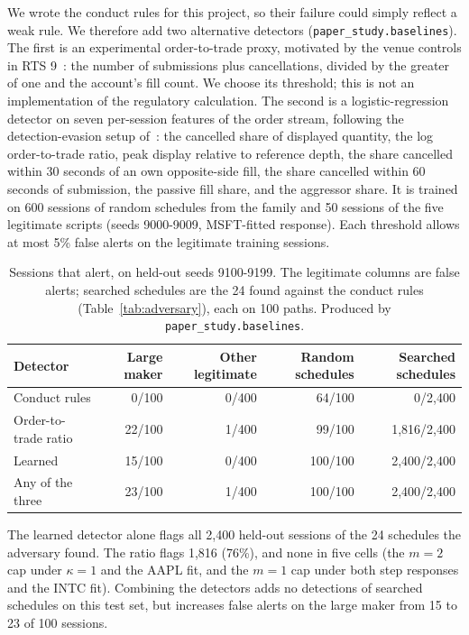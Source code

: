 \documentclass{article}
\begin{document}
We wrote the conduct rules for this project, so their failure could simply reflect a weak rule. We therefore add two alternative detectors (\texttt{paper\_study.baselines}). The first is an experimental order-to-trade proxy, motivated by the venue controls in RTS 9~\cite{r33}: the number of submissions plus cancellations, divided by the greater of one and the account's fill count. We choose its threshold; this is not an implementation of the regulatory calculation. The second is a logistic-regression detector on seven per-session features of the order stream, following the detection-evasion setup of~\cite{r3}: the cancelled share of displayed quantity, the log order-to-trade ratio, peak display relative to reference depth, the share cancelled within 30 seconds of an own opposite-side fill, the share cancelled within 60 seconds of submission, the passive fill share, and the aggressor share. It is trained on 600 sessions of random schedules from the family and 50 sessions of the five legitimate scripts (seeds 9000-9009, MSFT-fitted response). Each threshold allows at most 5\% false alerts on the legitimate training sessions.

\begin{table}[htbp]
\centering
\small
\begin{tabular}{lrrrr}
\toprule
\textbf{Detector} & \textbf{Large maker} & \textbf{Other legitimate} & \textbf{Random schedules} & \textbf{Searched schedules} \\
\midrule
Conduct rules & 0/100 & 0/400 & 64/100 & 0/2,400 \\
Order-to-trade ratio & 22/100 & 1/400 & 99/100 & 1,816/2,400 \\
Learned & 15/100 & 0/400 & 100/100 & 2,400/2,400 \\
Any of the three & 23/100 & 1/400 & 100/100 & 2,400/2,400 \\
\bottomrule
\end{tabular}
\caption{Sessions that alert, on held-out seeds 9100-9199. The legitimate columns are false alerts; searched schedules are the 24 found against the conduct rules (Table~\ref{tab:adversary}), each on 100 paths. Produced by \texttt{paper\_study.baselines}.}
\label{tab:baselines}
\end{table}

The learned detector alone flags all 2,400 held-out sessions of the 24 schedules the adversary found. The ratio flags 1,816 (76\%), and none in five cells (the $m = 2$ cap under $\kappa = 1$ and the AAPL fit, and the $m = 1$ cap under both step responses and the INTC fit). Combining the detectors adds no detections of searched schedules on this test set, but increases false alerts on the large maker from 15 to 23 of 100 sessions.
\end{document}
